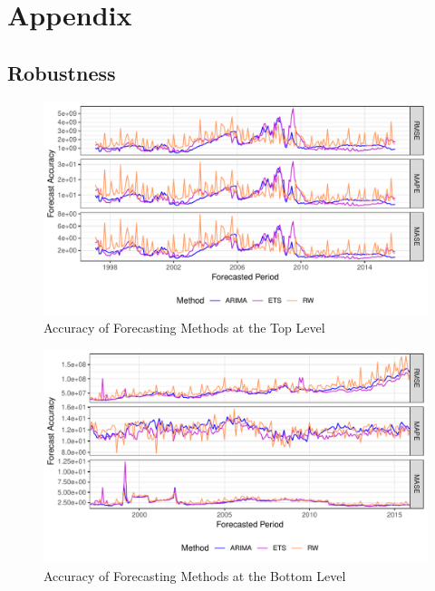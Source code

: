 
\appendix
\section{Appendix}

\subsection{Robustness}
\label{sec:robust}

\begin{figure}[H]
	\includegraphics[width=\textwidth]{fig/fig_eval_methods_top}
	\caption{Accuracy of Forecasting Methods at the Top Level}
\end{figure}

\begin{figure}[H]
	\includegraphics[width=\textwidth]{fig/fig_eval_methods_bottom}
	\caption{Accuracy of Forecasting Methods at the Bottom Level}
\end{figure}

